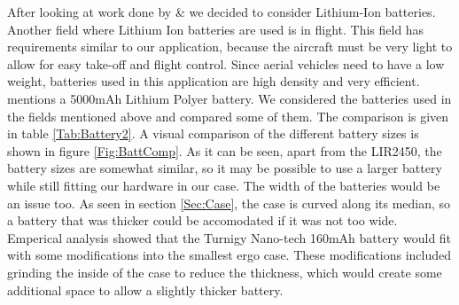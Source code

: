 After looking at work done by \cite{Web:ShimmerHome} \& \cite{drennan2010assessment} we decided to consider Lithium-Ion batteries. Another field where Lithium Ion batteries are used is in flight. This field has requirements similar to our application, because the aircraft must be very light to allow for easy take-off and flight control. Since aerial vehicles need to have a low weight, batteries used in this application are high density and very efficient. \cite{neitzel2011mobile} mentions a 5000mAh Lithium Polyer battery. We considered the batteries used in the fields mentioned above and compared some of them. The comparison is given in table \ref{Tab:Battery2}. A visual comparison of the different battery sizes is shown in figure \ref{Fig:BattComp}. As it can be seen, apart from the LIR2450, the battery sizes are somewhat similar,
so it may be possible to use a larger battery while still fitting our hardware in our case.
The width of the batteries would be an issue too.
As seen in section \ref{Sec:Case},
the case is curved along its median,
so a battery that was thicker could be accomodated if it was not too wide.
Emperical analysis showed that the Turnigy Nano-tech 160mAh battery
would fit with some modifications into the smallest ergo case.
These modifications included grinding the inside of the case to reduce the thickness,
which would create some additional space to allow a slightly thicker battery.


